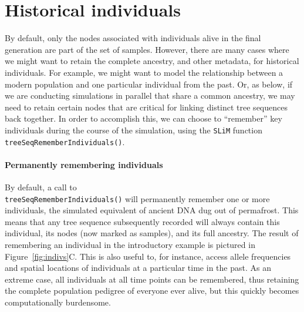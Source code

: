 \documentclass[12pt]{article}
\newcommand{\slim}[0]{\texttt{SLiM}\xspace}
\begin{document}
\section*{Historical individuals}
By default, only the nodes associated with individuals alive in the final generation are part of the set of samples.
However, there are many cases where we might want to retain the complete ancestry, and other metadata, for
historical individuals.
For example, we might want to model the relationship between a modern population and
one particular individual from the past.
Or, as below, if we are conducting simulations in parallel that share 
a common ancestry, we may need to retain certain nodes that are critical for linking distinct
tree sequences back together.
In order to accomplish this, we can choose to ``remember'' key individuals during the course of the simulation,
using the \slim function \verb|treeSeqRememberIndividuals()|.

\paragraph{Permanently remembering individuals}
By default, a call to \\ 
\verb|treeSeqRememberIndividuals()| will permanently remember one or more individuals,
the simulated equivalent of ancient DNA dug out of permafrost.
This means that any tree sequence subsequently recorded will always contain this individual,
its nodes (now marked as samples), and its full ancestry.
The result of remembering an individual in the introductory example is pictured
in Figure~\ref{fig:indivs}C.
This is also useful to, for instance, access allele frequencies and spatial locations of individuals
at a particular time in the past.
As an extreme case, all individuals at all time points can be remembered,
thus retaining the complete population pedigree of everyone ever alive,
but this quickly becomes computationally burdensome.
\end{document}
